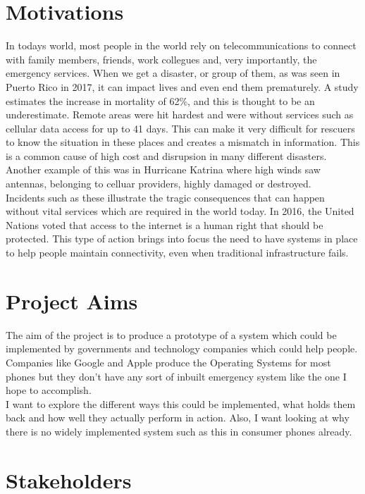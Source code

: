 \documentclass{report}
\begin{document}
\section*{Motivations}
In todays world, most people in the world rely on telecommunications to connect with family members, friends, 
work collegues and, very importantly, the emergency services. When we get a disaster, or group of them, as was 
seen in Puerto Rico in 2017, it can impact lives and even end them prematurely. A study estimates the increase in 
mortality of 62\%\cite{kishore2018mortality}, and this is thought to be an underestimate. Remote areas were hit hardest and were without services 
such as cellular data access for up to 41 days. This can make it very difficult for rescuers to know the situation in 
these places and creates a mismatch in information. This is a common cause of high cost and disrupsion in many different disasters. 
Another example of this was in Hurricane Katrina\cite{banipal2006strategic} where high winds saw antennas, belonging to celluar 
providers, highly damaged or destroyed. 
\bigskip\\
Incidents such as these illustrate the tragic consequences that can happen without vital services which are required in the 
world today. In 2016, the United Nations voted that access to the internet is a human right that should be protected\cite{UNResolutionJune2016}. 
This type of action brings into focus the need to have systems in place to help people maintain connectivity, even when traditional infrastructure 
fails. 

\section*{Project Aims}

The aim of the project is to produce a prototype of a system which could be implemented by governments and technology 
companies which could help people. Companies like Google and Apple produce the Operating Systems for most phones but 
they don't have any sort of inbuilt emergency system like the one I hope to accomplish. 
\bigskip\\
I want to explore the different ways this could be implemented, what holds them back and how well they actually perform 
in action. Also, I want looking at why there is no widely implemented system such as this in consumer phones already. 

\section*{Stakeholders}
\end{document}
